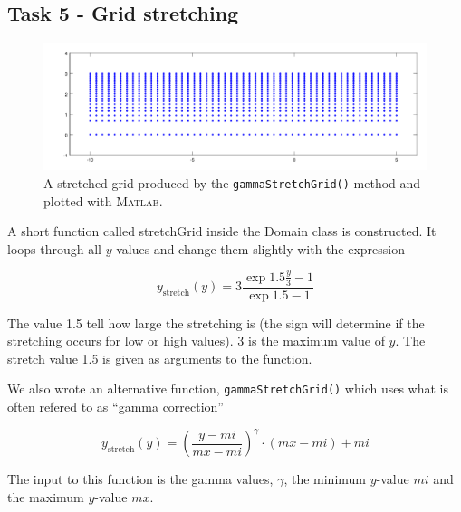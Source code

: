 \documentclass[paper=a4, fontsize=12pt]{article} %
\begin{document}
\subsection*{Task 5 - Grid stretching}


\begin{figure}[H]
  \centering
  \includegraphics[width=\textwidth]{task5.pdf}
  \caption{A stretched grid produced by the \texttt{gammaStretchGrid()} method and plotted with \textsc{Matlab.}\label{fig:stretched}}
\end{figure}

A short function called stretchGrid inside the Domain class is constructed. It loops through all $y$-values and change them slightly with the expression

$$ y_\textrm{stretch}(y) = 3 \frac{\exp{1.5\frac{y}{3}}-1}{\exp{1.5}-1}$$

The value 1.5 tell how large the stretching is (the sign will determine if the stretching occurs for low or high values). 3 is the maximum value of $y$. The stretch value 1.5 is given as arguments to the function.

We also wrote an alternative function, \texttt{gammaStretchGrid()} which uses what is often refered to as ``gamma correction''

$$ y_\textrm{stretch}(y) =  \left ( \frac{y-mi}{mx-mi}\right )^\gamma \cdot (mx-mi) + mi$$

The input to this function is the gamma values, $\gamma$, the minimum $y$-value $mi$ and the maximum $y$-value $mx$.
\end{document}
